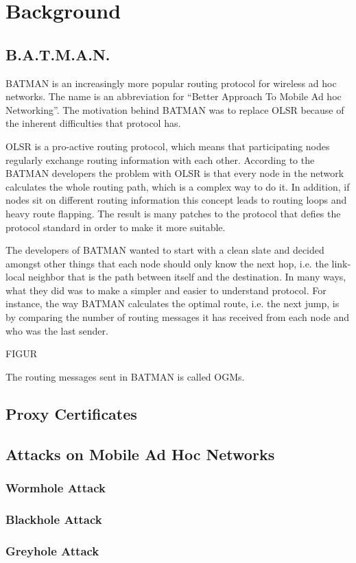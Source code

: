 \chapter{Background}

\section{B.A.T.M.A.N.}
BATMAN \cite{batman_rfc} is an increasingly more popular routing protocol for
wireless ad hoc networks. The name is an abbreviation for ``Better Approach To
Mobile Ad hoc Networking''. The motivation behind BATMAN was to replace OLSR
\cite{why-starting-batman} because of the inherent difficulties that protocol
has. 

OLSR is a pro-active routing protocol, which means that participating nodes
regularly exchange routing information with each other. According to the BATMAN
developers the problem with OLSR is that every node in the network calculates
the whole routing path, which is a complex way to do it. In addition, if nodes
sit on different routing information this concept leads to routing loops and
heavy route flapping. The result is many patches to the protocol that defies
the protocol standard in order to make it more suitable.

The developers of BATMAN wanted to start with a clean slate and decided amongst
other things that each node should only know the next hop, i.e. the link-local
neighbor that is the path between itself and the destination. In many ways, what
they did was to make a simpler and easier to understand protocol. For instance,
the way BATMAN calculates the optimal route, i.e. the next jump, is by comparing
the number of routing messages it has received from each node and who was the
last sender.

FIGUR

The routing messages sent in BATMAN is called \acp{OGM}.



\section{Proxy Certificates}

\section{Attacks on Mobile Ad Hoc Networks}
\subsection{Wormhole Attack}
\subsection{Blackhole Attack}
\subsection{Greyhole Attack}
